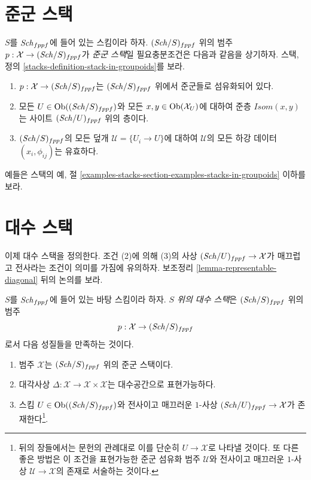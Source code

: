 \section{준군 스택}
\label{section-stacks}

\noindent
$S$를 $\mathit{Sch}_{fppf}$에 들어 있는 스킴이라 하자. $(\mathit{Sch}/S)_{fppf}$
위의 범주 $p : \mathcal{X} \to (\mathit{Sch}/S)_{fppf}$가
{\it 준군 스택}일 필요충분조건은 다음과 같음을 상기하자. 스택, 정의
\ref{stacks-definition-stack-in-groupoids}를 보라.
\begin{enumerate}
\item $p : \mathcal{X} \to (\mathit{Sch}/S)_{fppf}$는 $(\mathit{Sch}/S)_{fppf}$
위에서 준군들로 섬유화되어 있다.
\item 모든 $U \in \mathop{\mathrm{Ob}}\nolimits((\mathit{Sch}/S)_{fppf})$와 모든
$x, y\in \mathop{\mathrm{Ob}}\nolimits(\mathcal{X}_U)$에 대하여 준층
$\mathit{Isom}(x, y)$는 사이트 $(\mathit{Sch}/U)_{fppf}$ 위의 층이다.
\item $(\mathit{Sch}/S)_{fppf}$의 모든 덮개
$\mathcal{U} = \{U_i \to U\}$에 대하여 $\mathcal{U}$의 모든 하강
데이터 $(x_i, \phi_{ij})$는 유효하다.
\end{enumerate}
예들은 스택의 예, 절
\ref{examples-stacks-section-examples-stacks-in-groupoids} 이하를 보라.










\section{대수 스택}
\label{section-algebraic-stacks}

\noindent
이제 대수 스택을 정의한다. 조건 (2)에 의해 (3)의 사상
$(\mathit{Sch}/U)_{fppf} \to \mathcal{X}$가 매끄럽고 전사라는 조건이 의미를
가짐에 유의하자. 보조정리 \ref{lemma-representable-diagonal} 뒤의 논의를
보라.

\begin{definition}
\label{definition-algebraic-stack}
$S$를 $\mathit{Sch}_{fppf}$에 들어 있는 바탕 스킴이라 하자.
{\it $S$ 위의 대수 스택}은 $(\mathit{Sch}/S)_{fppf}$ 위의 범주
$$
p : \mathcal{X} \to (\mathit{Sch}/S)_{fppf}
$$
로서 다음 성질들을 만족하는 것이다.
\begin{enumerate}
\item 범주 $\mathcal{X}$는 $(\mathit{Sch}/S)_{fppf}$ 위의 준군 스택이다.
\item 대각사상
$\Delta : \mathcal{X} \to \mathcal{X} \times \mathcal{X}$는
대수공간으로 표현가능하다.
\item 스킴 $U \in \mathop{\mathrm{Ob}}\nolimits((\mathit{Sch}/S)_{fppf})$와 전사이고 매끄러운 $1$-사상
$(\mathit{Sch}/U)_{fppf} \to \mathcal{X}$가 존재한다\footnote{뒤의 장들에서는
문헌의 관례대로 이를 단순히 $U \to \mathcal{X}$로 나타낼 것이다.
또 다른 좋은 방법은 이 조건을 표현가능한 준군 섬유화 범주
$\mathcal{U}$와 전사이고 매끄러운 $1$-사상
$\mathcal{U} \to \mathcal{X}$의 존재로 서술하는 것이다.}.
\end{enumerate}
\end{definition}

